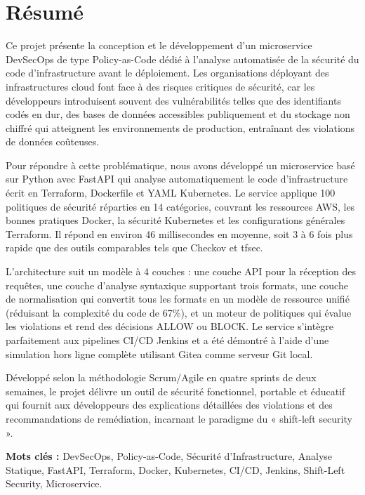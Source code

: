 \vspace{2cm}


\chapter*{Résumé}

Ce projet présente la conception et le développement d'un microservice DevSecOps de type Policy-as-Code dédié à l'analyse automatisée de la sécurité du code d'infrastructure avant le déploiement. Les organisations déployant des infrastructures cloud font face à des risques critiques de sécurité, car les développeurs introduisent souvent des vulnérabilités telles que des identifiants codés en dur, des bases de données accessibles publiquement et du stockage non chiffré qui atteignent les environnements de production, entraînant des violations de données coûteuses.

Pour répondre à cette problématique, nous avons développé un microservice basé sur Python avec FastAPI qui analyse automatiquement le code d'infrastructure écrit en Terraform, Dockerfile et YAML Kubernetes. Le service applique 100 politiques de sécurité réparties en 14 catégories, couvrant les ressources AWS, les bonnes pratiques Docker, la sécurité Kubernetes et les configurations générales Terraform. Il répond en environ 46 millisecondes en moyenne, soit 3 à 6 fois plus rapide que des outils comparables tels que Checkov et tfsec.

L'architecture suit un modèle à 4 couches : une couche API pour la réception des requêtes, une couche d'analyse syntaxique supportant trois formats, une couche de normalisation qui convertit tous les formats en un modèle de ressource unifié (réduisant la complexité du code de 67\%), et un moteur de politiques qui évalue les violations et rend des décisions ALLOW ou BLOCK. Le service s'intègre parfaitement aux pipelines CI/CD Jenkins et a été démontré à l'aide d'une simulation hors ligne complète utilisant Gitea comme serveur Git local.

Développé selon la méthodologie Scrum/Agile en quatre sprints de deux semaines, le projet délivre un outil de sécurité fonctionnel, portable et éducatif qui fournit aux développeurs des explications détaillées des violations et des recommandations de remédiation, incarnant le paradigme du « shift-left security ».

\vspace{0.5cm}
\noindent \textbf{Mots clés :} DevSecOps, Policy-as-Code, Sécurité d'Infrastructure, Analyse Statique, FastAPI, Terraform, Docker, Kubernetes, CI/CD, Jenkins, Shift-Left Security, Microservice.

